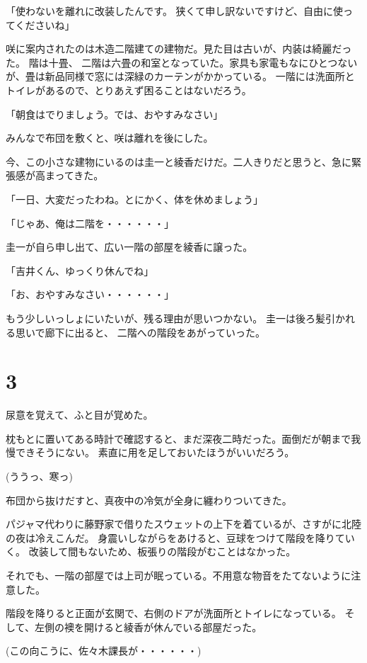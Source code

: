 ﻿\documentclass[book,tate]{jlreq}
\begin{document}
「使わないを離れに改装したんです。 狭くて申し訳ないですけど、自由に使ってくださいね」

咲に案内されたのは木造二階建ての建物だ。見た目は古いが、内装は綺麗だった。 階は十畳、
二階は六畳の和室となっていた。家具も家電もなにひとつないが、畳は新品同様で窓には深緑のカーテンがかかっている。
一階には洗面所とトイレがあるので、とりあえず困ることはないだろう。

「朝食はでりましょう。では、おやすみなさい」

みんなで布団を敷くと、咲は離れを後にした。

今、この小さな建物にいるのは圭一と綾香だけだ。二人きりだと思うと、急に緊張感が高まってきた。

「一日、大変だったわね。とにかく、体を休めましょう」

「じゃあ、俺は二階を・・・・・・」

圭一が自ら申し出て、広い一階の部屋を綾香に譲った。

「吉井くん、ゆっくり休んでね」

「お、おやすみなさい・・・・・・」

もう少しいっしょにいたいが、残る理由が思いつかない。 圭一は後ろ髪引かれる思いで廊下に出ると、
二階への階段をあがっていった。

\section*{3}

尿意を覚えて、ふと目が覚めた。

枕もとに置いてある時計で確認すると、まだ深夜二時だった。面倒だが朝まで我慢できそうにない。
素直に用を足しておいたほうがいいだろう。

(ううっ、寒っ)

布団から抜けだすと、真夜中の冷気が全身に纏わりついてきた。

パジャマ代わりに藤野家で借りたスウェットの上下を着ているが、さすがに北陸の夜は冷えこんだ。
身震いしながらをあけると、豆球をつけて階段を降りていく。 
改装して間もないため、板張りの階段がむことはなかった。

それでも、一階の部屋では上司が眠っている。不用意な物音をたてないように注意した。

階段を降りると正面が玄関で、右側のドアが洗面所とトイレになっている。
そして、左側の襖を開けると綾香が休んでいる部屋だった。

(この向こうに、佐々木課長が・・・・・・)
\end{document}
